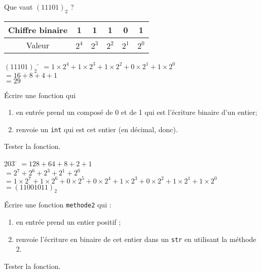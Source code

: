 \documentclass[a4paper,12pt,french]{book}
\begin{document}

\begin{methode}
Que vaut $(11101)_2$ ?
\begin{center}
	\begin{tabular}{|c|c|c|c|c|c|}
		\hline 
		Chiffre binaire & 1 & 1 & 1 & 0 & 1 \\ 
		\hline 
		Valeur & $2^4$ & $2^3$ & $2^2$ & $2^1$ & $2^0$ \\ 
		\hline 
	\end{tabular}
\end{center}
\begin{tabbing}
		$(11101)_2$	\= 	$=1\times 2^4+1\times 2^3+1\times 2^2+0\times 2^1+1\times 2^0$	\\
			\>	$=16+8+4+1$	\\	
			\>	$=29$	
	\end{tabbing}\nopagebreak
\end{methode}
\begin{exercice}[]
Écrire une fonction  qui
\begin{enumerate}[--]
	\item 	en entrée prend un  composé de 0 et de 1 qui est l'écriture binaire d'un entier;
	\item 	renvoie un \texttt{int} qui est cet entier (en décimal, donc).
\end{enumerate}
Tester la fonction.
\end{exercice}

\begin{methode}
\begin{tabbing}
	203	\= 	$=128+64+8+2+1$	\\
	
		\>	$=2^7+2^6+2^3+2^1+2^0$	\\
		
		\>	$=1\times 2^7+1\times 2^6+0\times 2^5 + 0\times 2^4 +1\times 2^3+0\times 2^2 + 1\times 
		2^1+1\times 2^0$	\\
		
		\> $=(11001011)_2$
\end{tabbing}
\end{methode}

\begin{exercice}[]
\'Ecrire une fonction \texttt{methode2} qui :
\begin{enumerate}[--]
	\item 	en entrée prend  un entier positif ;
	\item 	renvoie l'écriture en binaire de cet entier dans un \texttt{str} en utilisant la méthode 2.\\
\end{enumerate}
Tester la fonction.
\end{exercice}
\end{document}
